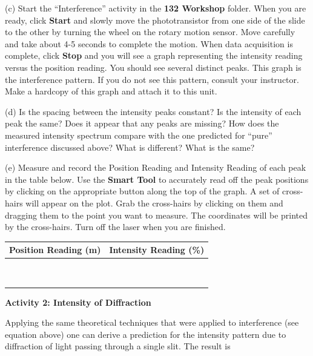 (c) Start the ``Interference'' activity in the {\bf 132 Workshop} folder. 
When you are ready, click {\bf Start} and slowly move the phototransistor from one side of the slide to the other by turning the wheel on the rotary motion sensor. Move carefully and take about 4-5 seconds to complete the motion. When data acquisition is complete, click {\bf Stop} and you will see a graph
representing the intensity reading versus the position reading. You
should see several distinct peaks. This graph is the interference
pattern. If you do not see this pattern, consult your instructor.
Make a hardcopy of this graph and attach it to this unit.

(d) Is the spacing between the intensity peaks constant? Is the intensity
of each peak the same? Does it appear that any peaks are missing?
How does the measured intensity spectrum compare with the one predicted
for {}``pure'' interference discussed above? What is different?
What is the same?
\vspace{30mm}

(e) Measure and record the Position Reading and Intensity Reading
of each peak in the table below.
Use the
{\bf Smart Tool} to accurately read off the peak positions by clicking on the
appropriate button along the top of the graph. A set of cross-hairs will appear on the
plot. Grab the cross-hairs by clicking on them and dragging them to the point you want
to measure.
The coordinates will be printed by the cross-hairs.
Turn off the laser when you are finished.

\vspace{0.3cm}
{\centering \begin{tabular}{|c|c|}
\hline 
Position Reading (m)&
Intensity Reading (\%)\\
\hline
\hline 
&
\\
\hline 
&
\\
\hline 
&
\\
\hline 
&
\\
\hline 
&
\\
\hline 
&
\\
\hline 
&
\\
\hline 
&
\\
\hline 
&
\\
\hline
\end{tabular}\par}
\vspace{0.3cm}

\textbf{Activity 2: Intensity of Diffraction} 

Applying the same theoretical techniques that were applied to interference
(see equation above) one can derive a prediction for the intensity
pattern due to diffraction of light passing through a single slit.
The result is 


